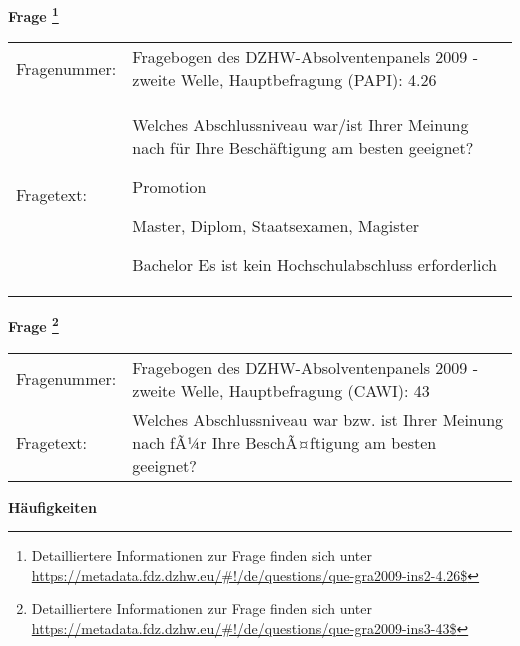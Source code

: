 				\vspace*{0.5cm}
                \noindent\textbf{Frage
	                \footnote{Detailliertere Informationen zur Frage finden sich unter
		              \url{https://metadata.fdz.dzhw.eu/\#!/de/questions/que-gra2009-ins2-4.26$}}}\\
				\begin{tabularx}{\hsize}{@{}lX}
					Fragenummer: &
					  Fragebogen des DZHW-Absolventenpanels 2009 - zweite Welle, Hauptbefragung (PAPI):
					  4.26
 \\
					Fragetext: & Welches Abschlussniveau war/ist Ihrer Meinung nach für Ihre Beschäftigung am besten geeignet?\par  Promotion\par  Master, Diplom, Staatsexamen, Magister\par  Bachelor Es ist kein Hochschulabschluss erforderlich \\
				\end{tabularx}
				\vspace*{0.5cm}
                \noindent\textbf{Frage
	                \footnote{Detailliertere Informationen zur Frage finden sich unter
		              \url{https://metadata.fdz.dzhw.eu/\#!/de/questions/que-gra2009-ins3-43$}}}\\
				\begin{tabularx}{\hsize}{@{}lX}
					Fragenummer: &
					  Fragebogen des DZHW-Absolventenpanels 2009 - zweite Welle, Hauptbefragung (CAWI):
					  43
 \\
					Fragetext: & Welches Abschlussniveau war bzw. ist Ihrer Meinung nach fÃ¼r Ihre BeschÃ¤ftigung am besten geeignet? \\
				\end{tabularx}





        		\vspace*{0.5cm}
                \noindent\textbf{Häufigkeiten}

